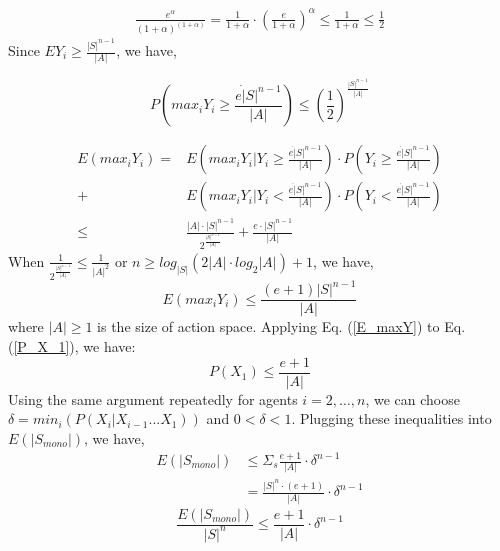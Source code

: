 \begin{equation} 
\begin{aligned}
\frac{e^\alpha }{(1+\alpha)^{(1+\alpha)}} = \frac{1}{1+\alpha}\cdot (\frac{e}{1+\alpha})^\alpha 
\leq \frac{1}{1+\alpha} 
\leq \frac{1}{2}
\end{aligned}
\label{P_maxY_union}
\end{equation}
Since  $EY_i \geq \frac{|S|^{n-1}}{|A|}$,  we have,

\begin{equation} 
P(max_{i}Y_i \geq \frac{e\dot|S|^{n-1}}{|A|}) \leq ( \frac{1}{2})^\frac{|S|^{n-1}}{|A|}
\label{P_maxY_union}
\end{equation}

\begin{equation}
\begin{aligned}
E(max_{i}Y_i) =  &E(max_{i}Y_i|Y_i \geq \frac{e\dot|S|^{n-1}}{|A|}) \cdot P(Y_i \geq \frac{e\dot|S|^{n-1}}{|A|}) \\ 
+ &E(max_{i}Y_i|Y_i < \frac{e\dot|S|^{n-1}}{|A|}) \cdot P(Y_i < \frac{e\dot|S|^{n-1}}{|A|}) \\
\leq &\frac{|A|\cdot|S|^{n-1}}{2^\frac{|S|^{n-1}}{|A|}} + \frac{e\cdot |S|^{n-1}}{|A|} 
\end{aligned}
\label{P_maxY_union}
\end{equation}
When $\frac{1}{2^\frac{|S|^{n-1}}{|A|}} \leq \frac{1}{|A|^2}$ or $n \geq log_{|S|}(2|A|\cdot log_2|A|) + 1$, we have,
\begin{equation}
E(max_{i}Y_i) \leq \frac{(e+1)|S|^{n-1}}{|A|}
\label{E_maxY}
\end{equation}
where $|A| \geq 1$ is the size of action space. 
Applying Eq. (\ref{E_maxY}) to Eq. (\ref{P_X_1}), we have:
\begin{equation}
P(X_1) \leq \frac{e+1}{|A|}
\end{equation}
Using the same argument repeatedly for agents $i=2,\ldots,n$, we can choose $\delta = min_i(P(X_i|X_{i-1}...X_1))$ and $0 < \delta < 1$. Plugging these inequalities into $ E(|S_{mono}|) $, we have, 
\begin{equation}
\begin{aligned}
E(|S_{mono}|) &\leq \Sigma_s\frac{e+1}{|A|}\cdot \delta^{n-1}  \\
&= \frac{|S|^n\cdot(e+1)}{|A|}\cdot \delta^{n-1}
\end{aligned}
\end{equation}
\begin{equation}
\frac{E(|S_{mono}|)}{|S|^n} \leq \frac{e+1}{|A|}\cdot \delta^{n-1} 
\end{equation}


